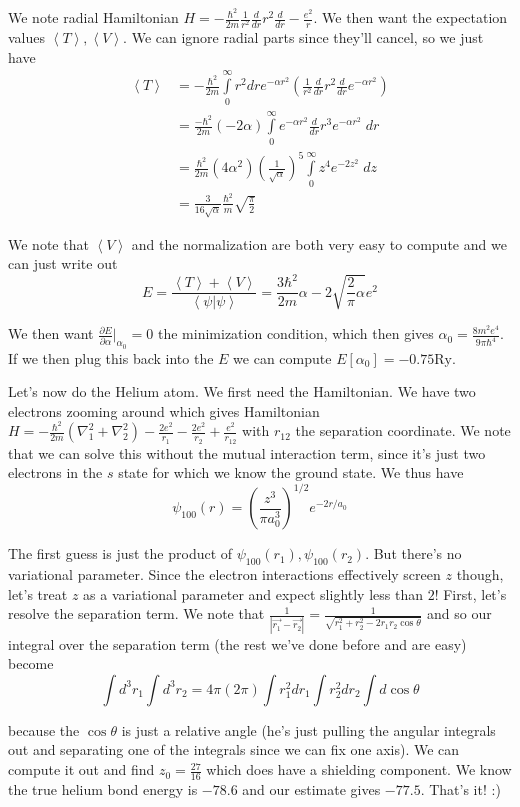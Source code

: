 \documentclass[10pt]{report}
\newcommand{\dotp}[2]{\left<#1\left.\right|#2\right>}
\newcommand{\rd}[2]{\frac{d#1}{d#2}}
\newcommand{\pd}[2]{\frac{\partial #1}{\partial#2}}
\newcommand{\abs}[1]{\left|#1\right|}
\newcommand{\expvalue}[1]{\left<#1\right>}
\begin{document}
We note radial Hamiltonian $H = -\frac{\hbar^2}{2m}\frac{1}{r^2}\rd{}{r} r^2 \rd{}{r} - \frac{e^2}{r}$. We then want the expectation values $\expvalue{T}, \expvalue{V}$. We can ignore radial parts since they'll cancel, so we just have
\begin{align*}
    \expvalue{T} &= -\frac{\hbar^2}{2m}\displaystyle\int\limits_{0}^{\infty}r^2 dr e^{-\alpha r^2}\left( \frac{1}{r^2}\rd{}{r}r^2 \rd{}{r}e^{-\alpha r^2} \right)\\
    &= \frac{ -\hbar^2}{2m}\left( -2\alpha \right)\displaystyle\int\limits_{0}^{\infty}e^{-\alpha r^2}\rd{}{r}r^3 e^{-\alpha r^2}\;dr\\
    &= \frac{\hbar^2}{2m} \left( 4\alpha^2 \right)\left( \frac{1}{\sqrt{\alpha}} \right)^5\displaystyle\int\limits_{0}^{\infty}z^4e^{-2z^2}\;dz\\
    &= \frac{3}{16\sqrt{\alpha}}\frac{\hbar^2}{m}\sqrt{\frac{\pi}{2}}
\end{align*}

We note that $\expvalue{V}$ and the normalization are both very easy to compute and we can just write out 
$$E = \frac{\expvalue{T} + \expvalue{V}}{\dotp{\psi}{\psi}} = \frac{3\hbar^2}{2m}\alpha - 2\sqrt{\frac{2}{\pi}\alpha}e^2$$

We then want $\pd{E}{\alpha}\Big|_{\alpha_0} = 0$ the minimization condition, which then gives $\alpha_0 = \frac{8m^2e^4}{9\pi \hbar^4}$. If we then plug this back into the $E$ we can compute $E[\alpha_0] = -0.75\mathrm{Ry}$.

Let's now do the Helium atom. We first need the Hamiltonian. We have two electrons zooming around which gives Hamiltonian $H = -\frac{\hbar^2}{2m}\left( \nabla_1^2 + \nabla_2^2 \right) - \frac{2e^2}{r_1} - \frac{2e^2}{r_2} + \frac{e^2}{r_{12}}$ with $r_{12}$ the separation coordinate. We note that we can solve this without the mutual interaction term, since it's just two electrons in the $s$ state for which we know the ground state. We thus have
$$\psi_{100}(r) = \left( \frac{z^3}{\pi a_0^3} \right)^{1/2}e^{-2r/a_0}$$

The first guess is just the product of $\psi_{100}(r_1), \psi_{100}(r_2)$. But there's no variational parameter. Since the electron interactions effectively screen $z$ though, let's treat $z$ as a variational parameter and expect slightly less than $2$! First, let's resolve the separation term. We note that $\frac{1}{\abs{\vec{r_1} - \vec{r_2}}} = \frac{1}{\sqrt{r_1^2 + r_2^2 - 2r_1r_2 \cos \theta}}$ and so our integral over the separation term (the rest we've done before and are easy) become
$$\int d^3 r_1 \int d^3 r_2 = 4\pi(2\pi)\int r_1^2 dr_1 \int r_2^2 dr_2 \int d\cos\theta$$

because the $\cos\theta$ is just a relative angle (he's just pulling the angular integrals out and separating one of the integrals since we can fix one axis). We can compute it out and find $z_0 = \frac{27}{16}$ which does have a shielding component. We know the true helium bond energy is $-78.6$ and our estimate gives $-77.5$. That's it! :)
\end{document}
